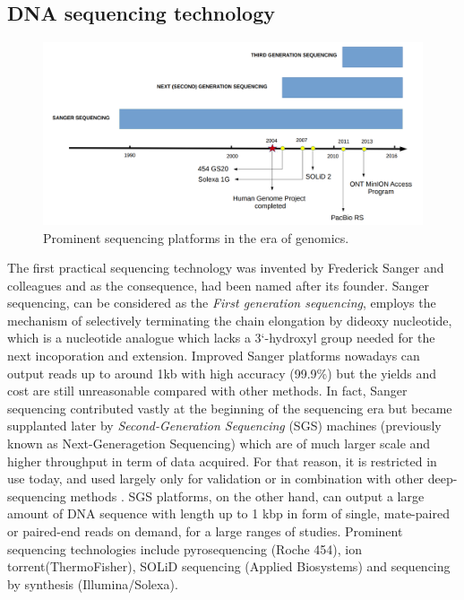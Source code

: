 \subsection{DNA sequencing technology}

\begin{figure}[ht!]
\centering
\includegraphics[width=.9\textwidth]{images/timeline.png}
\caption{Prominent sequencing platforms in the era of genomics.}
\label{Fig:nanopore}
\end{figure}
The first practical sequencing technology was invented by Frederick Sanger and colleagues \cite{Sanger1977} and as the consequence, had been named after its founder. 
Sanger sequencing, can be considered as the \emph{First generation sequencing}, employs the mechanism of selectively terminating the chain elongation by dideoxy nucleotide, which is a nucleotide analogue which lacks a 3`-hydroxyl group needed for the next incoporation and extension.
Improved Sanger platforms nowadays can output reads up to around 1kb with high accuracy (99.9\%) but the yields and cost are still unreasonable compared with other methods.
In fact, Sanger sequencing contributed vastly at the beginning of the sequencing era but became supplanted later by \emph{Second-Generation Sequencing} (SGS) machines (previously known as Next-Generagetion Sequencing) which are of much larger scale and higher throughput in term of data acquired. For that reason, it is restricted in use today, and used largely only for validation or in combination with other deep-sequencing methods \cite{Freeman2009}.
SGS platforms, on the other hand, can output a large amount of DNA sequence with length up to 1 kbp in form of single, mate-paired or paired-end reads on demand, for a large ranges of studies.
Prominent sequencing technologies include pyrosequencing \cite{Ronaghi1996,Ronaghi1998} 
(Roche 454), ion torrent(ThermoFisher), SOLiD sequencing (Applied Biosystems) and sequencing by synthesis (Illumina/Solexa).


